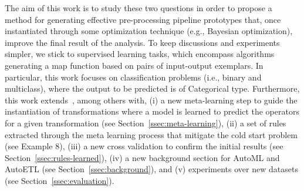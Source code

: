 The aim of this work is to study these two questions in order to propose a method for generating effective pre-processing pipeline prototypes that, once instantiated through some optimization technique (e.g., Bayesian optimization), improve the final result of the analysis.
To keep discussions and experiments simpler, we stick to supervised learning tasks, which encompass algorithms generating a map function based on pairs of input-output exemplars. In particular, this work focuses on classification problems (i.e., binary and multiclass), where the output to be predicted is of Categorical type. Furthermore, this work extends~\cite{Giovanelli2021DOLAP}, among others with, (i) a new meta-learning step to guide the instantiation of transformations where a model is learned to predict the operators for a given transformation (see Section~\ref{ssec:meta-learning}),
(ii) a set of rules extracted through the meta learning process that mitigate the cold start problem (see Example 8), (iii) a new cross validation to confirm the initial results (see Section~\ref{ssec:rules-learned}),
(iv) a new background section for AutoML and AutoETL (see Section~\ref{ssec:background}), and (v) experiments over new datasets (see Section~\ref{ssec:evaluation}). 


